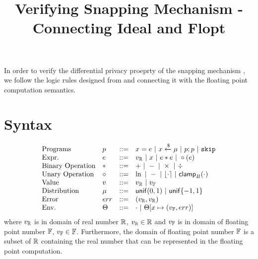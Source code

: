 \documentclass[a4paper,11pt]{article}
\begin{document}
\title{Verifying Snapping Mechanism - Connecting Ideal and Flopt}
\author{}

\date{}

\maketitle
In order to verify the differential privacy proeprty of
the snapping mechanism \cite{mironov2012significance},
we follow the logic rules designed from
\cite{barthe2016proving} and connecting 
it with the floating point computation semantics.
\section{Syntax}
\[\begin{array}{llll}
\mbox{Programs} & \prog & ::= & 
     \varx = \expr ~|~ \varx \samplel \edistr
	~|~ \prog ; \prog ~|~ \eskip \\

\mbox{Expr.} & \expr & ::= & \rval 
	~|~ \varx  ~|~ \expr \bop \expr
	~|~ \uop (\expr) \\
%
\mbox{Binary Operation} & \bop & ::= & + ~|~ - ~|~ \times ~|~ \div \\
%
\mbox{Unary Operation} & \uop & ::= & \ln ~|~ - ~|~ \round{\cdot} 
	~|~ \clamp_B(\cdot) \\
%
\mbox{Value} & \valv & ::= & \rval ~|~  \fval \\
%
\mbox{Distribution} & \edistr & ::= & \uniform(0, 1) 
%
	~|~ \uniform\{-1, 1\}\\ 
%
\mbox{Error} & \err & ::= & (\rval, \rval) \\
%
\mbox{Env.} & \trsenv & ::= & \cdot ~|~ \trsenv[x \mapsto (\fval, \err)] 
\end{array}
\]
where $v_{\mathbb{R}}$ is in domain of real number $\mathbb{R}$, $v_{\mathbb{R}} \in \mathbb{R}$ and $v_{\mathbb{F}}$ is in domain of floating point number $\mathbb{F}$, $v_{\mathbb{F}} \in \mathbb{F}$. Furthermore, the domain of floating point number $\mathbb{F}$ is a subset of $\mathbb{R}$ containing the real number that can be represented in the floating point computation.
\end{document}

